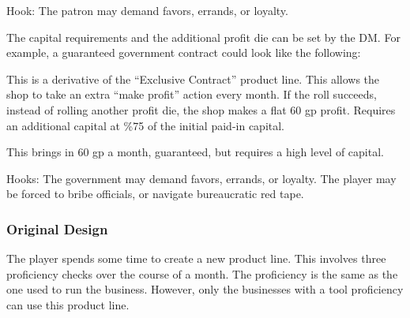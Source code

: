 \documentclass[twocolumn]{dndbook}
\begin{document}



Hook: The patron may demand favors, errands, or loyalty.\par

The capital requirements and the additional profit die can be set by the DM.
For example, a guaranteed government contract could look like the following:

\begin{DndComment}[color=bgtan2018]{}
	This is a derivative of the ``Exclusive Contract'' product line.
	This allows the shop to take an extra ``make profit'' action every month.
	If the roll succeeds, instead of rolling another profit die, the shop makes a flat 60 gp profit.
	Requires an additional capital at \%75 of the initial paid-in capital.
\end{DndComment}



This brings in 60 gp a month, guaranteed, but requires a high level of capital.

Hooks: The government may demand favors, errands, or loyalty.
The player may be forced to bribe officials, or navigate bureaucratic red tape.\par

\subsubsection{Original Design}


The player spends some time to create a new product line.
This involves three proficiency checks over the course of a month.
The proficiency is the same as the one used to run the business.
However, only the businesses with a tool proficiency can use this product line.\par
\end{document}
